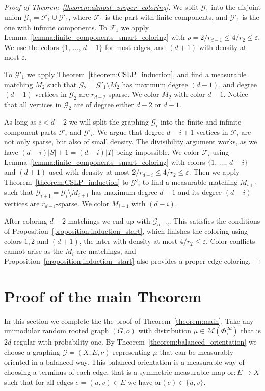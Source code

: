 \documentclass[11pt]{article}
\theoremstyle{definition}
\numberwithin{equation}{section}
\numberwithin{figure}{section}
\numberwithin{table}{section}
\newcommand{\F}{\mathcal{F}}
\newcommand{\G}{\mathcal{G}}
\newcommand{\clM}{\mathcal{M}}
\newcommand{\GoG}{\mathfrak{G}}
\newcommand{\orl}{\mathrm{or}}
\begin{document}
\begin{proof}[Proof of Theorem~\ref{theorem:almost_proper_coloring}]
We split $\G_1$ into the disjoint union $\G_1 = \F_1 \cup \G'_1$, where $\F_1$ is the part with finite components, and $\G'_1$ is the one with infinite components. To $\F_1$ we apply Lemma~\ref{lemma:finite_components_smart_coloring} with $\rho = 2 / r_{d-1} \leq 4 / r_2 \leq \varepsilon$. We use the colors $\{1,\,\ldots,\,d-1\}$ for most edges, and $(d+1)$ with density at most $\varepsilon$.

To $\G'_1$ we apply Theorem~\ref{theorem:CSLP_induction}, and find a measurable matching $M_2$ such that $\G_2 = \G'_1 \setminus M_2$ has maximum degree $(d-1)$, and degree $(d-1)$ vertices in $\G_2$ are $r_{d-2}$-sparse. We color $M_2$ with color $d-1$. Notice that all vertices in $\G_2$ are of degree either $d-2$ or $d-1$.

As long as $i<d-2$ we will split the graphing $\G_{i}$ into the finite and infinite component parts $\F_i$ and $\G'_{i}$. We argue that degree $d-i+1$ vertices in $\F_i$ are not only sparse, but also of small density. The divisibility argument works, as we have $(d-i)|S|+1 = (d-i)|T|$ being impossible. We color $\F_i$ using Lemma~\ref{lemma:finite_components_smart_coloring} with colors $\{1,\,\ldots,\,d-i\}$ and $(d+1)$ used with density at most $2/r_{d-i} \leq 4/r_2 \leq \varepsilon$. Then we apply Theorem~\ref{theorem:CSLP_induction} to $\G'_i$ to find a measurable matching $M_{i+1}$ such that $\G_{i+1}=\G_i \setminus M_{i+1}$ has maximum degree $d-1$ and its degree $(d-i)$ vertices are $r_{d-i}$-sparse. We color $M_{i+1}$ with $(d-i)$.

After coloring $d-2$ matchings we end up with $\G_{d-2}$. This satisfies the conditions of Proposition~\ref{proposition:induction_start}, which finishes the coloring using colors $1,2$ and $(d+1)$, the later with density at most $4/r_2 \leq \varepsilon$. Color conflicts cannot arise as the $M_i$ are matchings, and Proposition~\ref{proposition:induction_start} also provides a proper edge coloring.
\end{proof}

\section{Proof of the main Theorem} \label{section:proof_of_main}

In this section we complete the the proof of Theorem~\ref{theorem:main}. Take any unimodular random rooted graph $(G,o)$ with distribution $\mu \in \clM(\GoG^{2d}_{\circ})$ that is $2d$-regular with probability one. By Theorem~\ref{theorem:balanced_orientation} we choose a graphing $\G=(X,E,\nu)$ representing $\mu$ that can be measurably oriented in a balanced way. This balanced orientation is a measurable way of choosing a terminus of each edge, that is a symmetric measurable map $\orl: E \to X$ such that for all edges $e=(u,v) \in E$ we have $\orl(e) \in \{u,v\}$.
\end{document}

